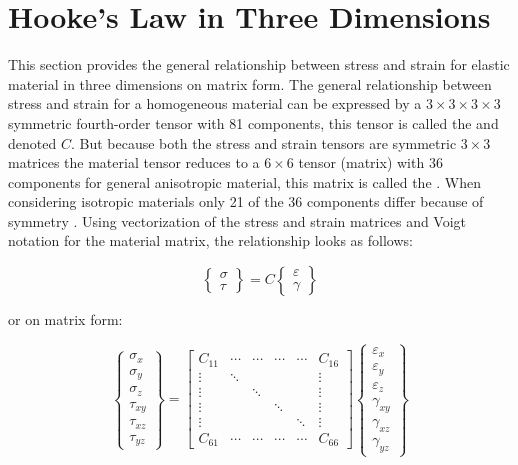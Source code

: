 
\chapter{Hooke's Law in Three Dimensions}
\label{appendix:hookes-law-on-matrix-form}
This section provides the general relationship between stress and
strain for elastic material in three dimensions on matrix form. The
general relationship between stress
and strain for a homogeneous material can be expressed by a
$3 \times 3 \times 3 \times 3$
symmetric fourth-order tensor with 81 components, this tensor is
called the  and denoted $C$. But because both
the stress and strain tensors are symmetric $3 \times 3$ matrices the
material tensor reduces to a $6 \times 6$ tensor (matrix) with 36
components for general anisotropic material, this matrix is called the
 . When
considering isotropic materials only 21 of the 36 components differ
because of symmetry .
%
Using vectorization of the stress and strain matrices and Voigt
notation for the material matrix, the relationship looks as follows:

\begin{equation}
\begin{Bmatrix}
\sigma \\
\tau
\end{Bmatrix}
= C 
\begin{Bmatrix}
\varepsilon \\
\gamma
\end{Bmatrix}
\end{equation}

or on matrix form:

\begin{equation}
\begin{Bmatrix}
\sigma_x \\
\sigma_y \\
\sigma_z \\
\tau_{xy} \\
\tau_{xz} \\
\tau_{yz}
\end{Bmatrix}
=
\begin{bmatrix}
C_{11} & \cdots & \cdots & \cdots & \cdots & C_{16} \\
\vdots & \ddots & & & & \vdots \\
\vdots & & \ddots & & & \vdots \\
\vdots & & & \ddots & & \vdots \\
\vdots & & & & \ddots & \vdots \\
C_{61} & \cdots & \cdots & \cdots & \cdots & C_{66}
\end{bmatrix}
\begin{Bmatrix}
\varepsilon_x \\
\varepsilon_y \\
\varepsilon_z \\
\gamma_{xy} \\
\gamma_{xz} \\
\gamma_{yz}
\end{Bmatrix}
\end{equation}


